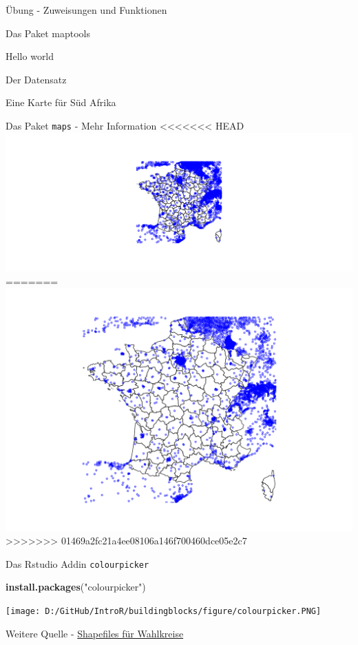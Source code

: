 \documentclass[ignorenonframetext,]{beamer}
\newenvironment{Shaded}{\begin{snugshade}}{\end{snugshade}}
\newcommand{\KeywordTok}[1]{\textcolor[rgb]{0.26,0.66,0.93}{\textbf{#1}}}
\newcommand{\NormalTok}[1]{\textcolor[rgb]{0.74,0.68,0.62}{#1}}
\newcommand{\StringTok}[1]{\textcolor[rgb]{0.02,0.61,0.04}{#1}}
\begin{document}
\begin{frame}[fragile]{Übung - Zuweisungen und Funktionen}
\begin{frame}[fragile]{Das Paket maptools}
\begin{frame}[fragile]{Hello world}
\begin{frame}[fragile]{Der Datensatz}
\begin{frame}[fragile]{Eine Karte für Süd Afrika}
\begin{frame}[fragile]{Das Paket \texttt{maps} - Mehr Information}
<<<<<<< HEAD
\includegraphics{Geomedizin_files/figure-beamer/unnamed-chunk-142-1.pdf}
=======
\includegraphics{Geomedizin_files/figure-beamer/unnamed-chunk-163-1.pdf}
>>>>>>> 01469a2fc21a4ee08106a146f700460dce05e2c7

\end{frame}

\begin{frame}[fragile]{Das Rstudio Addin \texttt{colourpicker}}
\protect\hypertarget{das-rstudio-addin-colourpicker}{}

\begin{Shaded}
\begin{Highlighting}[]
\KeywordTok{install.packages}\NormalTok{(}\StringTok{"colourpicker"}\NormalTok{)}
\end{Highlighting}
\end{Shaded}

\texttt{[image: D:/GitHub/IntroR/buildingblocks/figure/colourpicker.PNG]}

\end{frame}

\begin{frame}{Weitere Quelle -
\href{https://www.bundeswahlleiter.de/bundestagswahlen/2017/wahlkreiseinteilung/downloads.html}{Shapefiles
für Wahlkreise}}
\protect\hypertarget{weitere-quelle---shapefiles-fur-wahlkreise}{}


\end{frame}
\end{frame}
\end{frame}
\end{frame}
\end{frame}
\end{frame}
\end{document}
